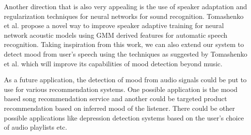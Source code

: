 \documentclass{article}
\begin{document}
Another direction that is also very appealing is the use of speaker adaptation and regularization techniques for neural networks for sound recognition. Tomashenko et al. \cite{tomashenko} propose a novel way to improve speaker adaptive training for neural network acoustic models using GMM derived features for automatic speech recognition. Taking inspiration from this work, we can also extend our system to detect mood from user’s speech using the techniques as suggested by Tomashenko et al. which will improve its capabilities of mood detection beyond music. 

As a future application, the detection of mood from audio signals could be put to use for various recommendation systems. One possible application is the mood based song recommendation service and another could be targeted product recommendation based on inferred mood of the listener. There could be other possible applications like depression detection systems based on the user’s choice of audio playlists etc.  
  
 

\end{document}
